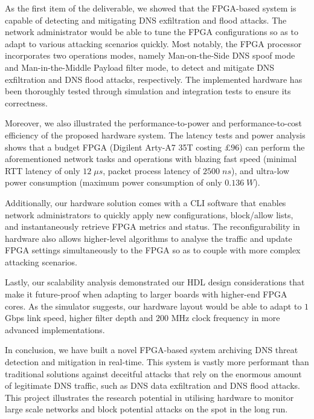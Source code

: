 \documentclass[a4paper]{report}
\begin{document}
As the first item of the deliverable, we showed that the FPGA-based system is capable of detecting and mitigating DNS exfiltration and flood attacks. The network administrator would be able to tune the FPGA configurations so as to adapt to various attacking scenarios quickly. Most notably, the FPGA processor incorporates two operations modes, namely Man-on-the-Side DNS spoof mode and Man-in-the-Middle Payload filter mode, to detect and mitigate DNS exfiltration and DNS flood attacks, respectively. The implemented hardware has been thoroughly tested through simulation and integration tests to ensure its correctness.

Moreover, we also illustrated the performance-to-power and performance-to-cost efficiency of the proposed hardware system. The latency tests and power analysis shows that a budget FPGA (Digilent Arty-A7 35T costing $£96$) can perform the aforementioned network tasks and operations with blazing fast speed (minimal RTT latency of only $12\; \mu s$, packet process latency of $2500\; ns$), and ultra-low power consumption (maximum power consumption of only $0.136\; W$). 

Additionally, our hardware solution comes with a CLI software that enables network administrators to quickly apply new configurations, block/allow lists, and instantaneously retrieve FPGA metrics and status. The reconfigurability in hardware also allows higher-level algorithms to analyse the traffic and update FPGA settings simultaneously to the FPGA so as to couple with more complex attacking scenarios.

Lastly, our scalability analysis demonstrated our HDL design considerations that make it future-proof when adapting to larger boards with higher-end FPGA cores. As the simulator suggests, our hardware layout would be able to adapt to $1$ Gbps link speed, higher filter depth and $200$ MHz clock frequency in more advanced implementations.

In conclusion, we have built a novel FPGA-based system archiving DNS threat detection and mitigation in real-time. This system is vastly more performant than traditional solutions against deceitful attacks that rely on the enormous amount of legitimate DNS traffic, such as DNS data exfiltration and DNS flood attacks. This project illustrates the research potential in utilising hardware to monitor large scale networks and block potential attacks on the spot in the long run.

\printbibliography[title=References]
\end{document}
